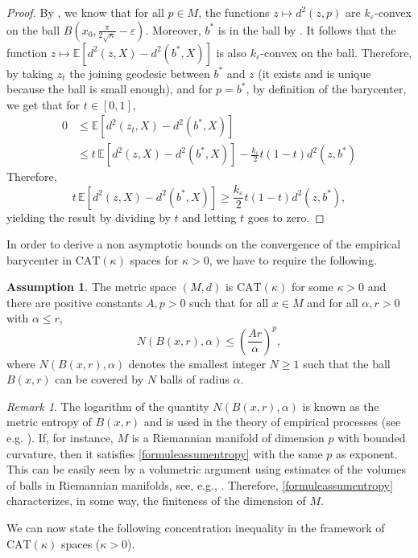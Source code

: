 \documentclass[10pt,a4paper]{article}
\theoremstyle{plain}
\theoremstyle{definition}
\newtheorem{assumption}[theorem]{Assumption}
\theoremstyle{remark}
\newtheorem{remark}[theorem]{Remark}
\newcommand{\E}{\mathbb{E}}
\newcommand{\CAT}{\textrm{CAT}}
\begin{document}
\begin{proof}
    By \cite[Proposition 3.1]{Ohtaconvexity}, we know that for all $p\in M$, the functions $z\mapsto d^2(z,p)$ are $k_\varepsilon$-convex on the ball $B\left(x_0,\frac{\pi}{2\sqrt{\kappa}}-\varepsilon\right)$. Moreover, $b^*$ is in the ball by \cite[Theorem B]{Yokota16}. It follows that the function $z\mapsto \E\left[ d^2(z,X)-d^2(b^*,X)\right]$ is also $k_\varepsilon$-convex on the ball. Therefore, by taking $z_t$ the joining geodesic between $b^*$ and $z$ (it exists and is unique because the ball is small enough), and for $p=b^*$, by definition of the barycenter, we get that for $t\in[0,1]$,
\begin{align*}    
     0 &\leq \E\left[ d^2(z_t,X)-d^2(b^*,X)\right]\\
     & \leq t\, \E\left[ d^2(z,X)-d^2(b^*,X)\right] -\frac{k_\varepsilon}{2}t(1-t)d^2(z,b^*)    
\end{align*}
Therefore, $$t\,\E\left[ d^2(z,X)-d^2(b^*,X)\right] \geq \frac{k_\varepsilon}{2}t(1-t)d^2(z,b^*),$$
yielding the result by dividing by $t$ and letting $t$ goes to zero.
\end{proof}
In order to derive a non asymptotic bounds on the convergence of the empirical barycenter in $\CAT(\kappa)$ spaces for $\kappa>0$, we have to require the following.

\begin{assumption}\label{assumentropy}
    The metric space $(M,d)$ is $\CAT(\kappa) $ for some $\kappa>0$ and there are positive constants $A,p>0$ such that for all $x\in M$ and for all $\alpha,r>0$ with $\alpha\leq r$,
    \begin{equation}\label{formuleassumentropy}
     N(B(x,r),\alpha) \leq \left(\frac{A r}{\alpha} \right)^p,
    \end{equation}
    where $N(B(x,r),\alpha)$ denotes the smallest integer $N\geq 1$ such that the ball $B(x,r)$ can be covered by $N$ balls of radius $\alpha$.
\end{assumption}

\begin{remark}
    The logarithm of the quantity $N(B(x,r),\alpha)$ is known as the metric entropy of $B(x,r)$ and is used in the theory of empirical processes (see e.g. \cite{surveymetricentropy}).
    If, for instance, $M$ is a Riemannian manifold of dimension $p$ with bounded curvature, then it satisfies \eqref{formuleassumentropy} with the same $p$ as exponent. This can be easily seen by a volumetric argument using estimates of the volumes of balls in Riemannian manifolds, see, e.g., \cite[Section III]{chavel2006riemannian}. Therefore, \eqref{formuleassumentropy} characterizes, in some way, the finiteness of the dimension of $M$. 
\end{remark}
We can now state the following concentration inequality in the framework of $\CAT(\kappa)$ spaces ($\kappa>0$).
\end{document}
